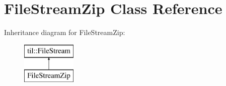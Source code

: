 \hypertarget{class_file_stream_zip}{
\section{FileStreamZip Class Reference}
\label{class_file_stream_zip}
}
Inheritance diagram for FileStreamZip:\begin{figure}[H]
\begin{center}
\leavevmode
\includegraphics[height=2.000000cm]{class_file_stream_zip}
\end{center}
\end{figure}
